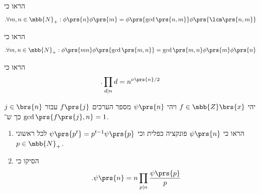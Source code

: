 \documentclass[a4paper,10pt,twoside,openany]{book}
\begin{document}
\begin{exercisechap}
הראו כי
\[\text{.} \forall m,n \in \mbb{N}_+ : \phi\prs{n} \phi\prs{m} = \phi\prs{\gcd\prs{n,m}} \phi\prs{\lcm\prs{n,m}}\]
\end{exercisechap}

\begin{exercisechap}
הראו כי
\[\text{.} \forall m,n \in \mbb{N}_+ : \phi\prs{mn} \phi\prs{\gcd\prs{m,n}} = \gcd\prs{m,n} \phi\prs{m} \phi\prs{n}\]
\end{exercisechap}

\begin{exercisechap}
הראו כי
\[\text{.} \prod_{d \mid n} d = n^{\nu\prs{n} / 2}\]
\end{exercisechap}

\begin{exercisechap}
יהי
$f \in \mbb{Z}\brs{x}$
ויהי
$\psi\prs{n}$
מספר הערכים
$f\prs{j}$
עבור
$j \in \brs{n}$
כך ש־%
$\gcd\prs{f\prs{j},n} = 1$.

\begin{enumerate}[label = (\alph*)]
\item הראו כי
$\psi\prs{n}$
פונקציה כפלית וכי
$\psi\prs{p^t} = p^{t-1} \psi\prs{p}$
לכל ראשוני
$p \in \mbb{N}_+$.

\item הסיקו כי
\[\text{.} \psi\prs{n} = n \prod_{p \mid n} \frac{\psi\prs{p}}{p}\]
\end{enumerate}

\end{exercisechap}

\printbibliography
\end{document}
